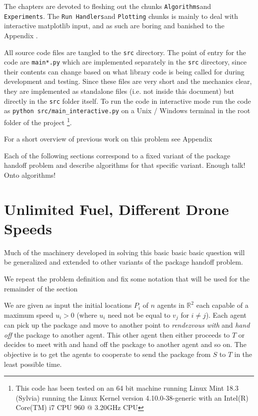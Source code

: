 \documentclass[12pt, english, oneside]{report}
\begin{document}
The chapters are devoted to fleshing out the chunks \textlangle \verb|Algorithms|\textrangle and 
\textlangle\verb|Experiments|\textrangle.  The \newline \textlangle \verb|Run Handlers|\textrangle and 
\textlangle \verb|Plotting|\textrangle \; chunks is mainly to deal with interactive matplotlib input, 
and as such are boring and banished to the Appendix \Winkey . 

All source code files are tangled to the \verb|src| directory. The point of entry for the code are 
\verb|main*.py| which are implemented separately in the \verb|src| directory, since their contents 
can change based on what library code is being called 
for during development and testing. Since these files are very short and the mechanics clear, 
they are implemented as standalone files (i.e. not inside this document) but directly in the \verb|src| folder 
itself. To run the code in interactive mode run the code as \verb|python src/main_interactive.py| on a 
Unix / Windows terminal in the root folder of the project \footnote{This code has been tested on an 64 bit 
machine running Linux Mint 18.3 (Sylvia) running the Linux Kernel version 4.10.0-38-generic with an 
Intel(R) Core(TM) i7 CPU 960 @ 3.20GHz CPU}. 

For a short overview of previous work on this problem see Appendix 

Each of the following sections correspond to a fixed variant of the package handoff problem and describe
algorithms for that specific variant. Enough talk! Onto algorithms! 

\section{Unlimited Fuel, Different Drone Speeds}

Much of the machinery developed in solving this basic basic basic question will be generalized and extended to 
other variants of the package handoff problem. 

We repeat the problem definition and fix some notation that will be used for the remainder 
of the section 

\begin{displayquote}
  We are given as input the initial locations $P_i$ of $n$  agents in $\mathbb{R}^2$ 
each capable of a maximum speed $u_i >0$ (where $u_i$ need not be equal to $v_j$ for $i \neq j$).
Each agent can pick up the package and move to another point to \textit{rendezvous with} and 
\textit{hand off} the 
package to another agent. This other agent then either proceeds to $T$ or decides to meet with 
and hand off the package to another agent and so on. 
The objective is to get the agents to cooperate to send the package from $S$ to $T$ in the 
least possible time. 
\end{displayquote}
\end{document}
